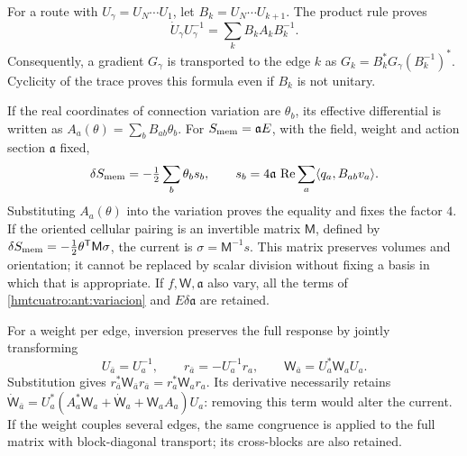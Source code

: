 For a route with \(U_\gamma=U_N\cdots U_1\), let \(B_k=U_N\cdots U_{k+1}\). The product rule proves
\begin{equation}
 \dot U_\gamma U_\gamma^{-1}
 =\sum_k B_kA_kB_k^{-1}.
 \label{hmtcuatro:ant:variacion-ruta}
\end{equation}
Consequently, a gradient \(G_\gamma\) is transported to the edge \(k\) as \(G_k=B_k^*G_\gamma(B_k^{-1})^*\). Cyclicity of the trace proves this formula even if \(B_k\) is not unitary.

If the real coordinates of connection variation are \(\theta_b\), its effective differential is written as \(A_a(\theta)=\sum_b B_{ab}\theta_b\). For \(S_{\rm mem}=\mathfrak a E\), with the field, weight and action section \(\mathfrak a\) fixed,
\begin{equation}
 \delta S_{\rm mem}=-\tfrac12\sum_b\theta_b s_b,\qquad
 s_b=4\mathfrak a\,\operatorname{Re}
          \sum_a\langle q_a,B_{ab}v_a\rangle .
 \label{hmtcuatro:ant:corriente-celular}
\end{equation}
Substituting \(A_a(\theta)\) into the variation proves the equality and fixes the factor \(4\). If the oriented cellular pairing is an invertible matrix \(\mathsf M\), defined by \(\delta S_{\rm mem}=-\frac12\theta^{\mathsf T}\mathsf M\sigma\), the current is \(\sigma=\mathsf M^{-1}s\). This matrix preserves volumes and orientation; it cannot be replaced by scalar division without fixing a basis in which that is appropriate. If \(f,\mathsf W,\mathfrak a\) also vary, all the terms of \eqref{hmtcuatro:ant:variacion} and \(E\delta\mathfrak a\) are retained.

For a weight per edge, inversion preserves the full response by jointly transforming
\[
 U_{\bar a}=U_a^{-1},\qquad
 r_{\bar a}=-U_a^{-1}r_a,\qquad
 \mathsf W_{\bar a}=U_a^*\mathsf W_aU_a .
\]
Substitution gives \(r_{\bar a}^*\mathsf W_{\bar a}r_{\bar a}=r_a^*\mathsf W_ar_a\). Its derivative necessarily retains \(\dot{\mathsf W}_{\bar a}
=U_a^*(A_a^*\mathsf W_a+\dot{\mathsf W}_a+\mathsf W_aA_a)U_a\): removing this term would alter the current. If the weight couples several edges, the same congruence is applied to the full matrix with block-diagonal transport; its cross-blocks are also retained.

